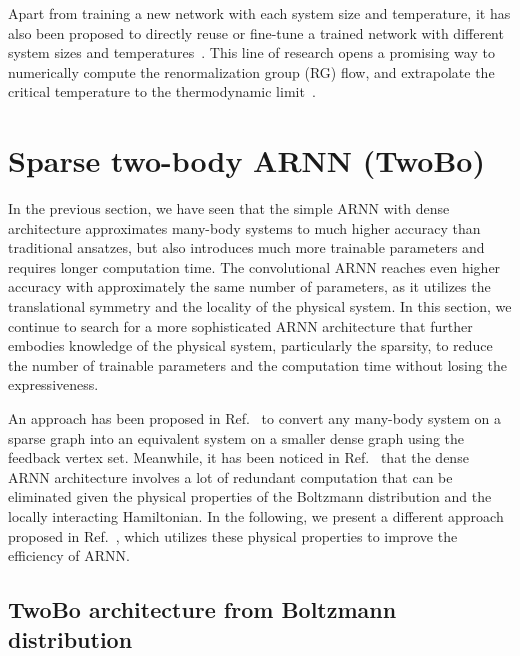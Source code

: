Apart from training a new network with each system size and temperature, it has also been proposed to directly reuse or fine-tune a trained network with different system sizes and temperatures~\cite{efthymiou2019super, mills2019extensive, rende2024fine}. This line of research opens a promising way to numerically compute the renormalization group (RG) flow, and extrapolate the critical temperature to the thermodynamic limit~\cite{ron2002inverse}.

\section{Sparse two-body ARNN (TwoBo)}
\label{sec:twobo}

In the previous section, we have seen that the simple ARNN with dense architecture approximates many-body systems to much higher accuracy than traditional ansatzes, but also introduces much more trainable parameters and requires longer computation time. The convolutional ARNN reaches even higher accuracy with approximately the same number of parameters, as it utilizes the translational symmetry and the locality of the physical system. In this section, we continue to search for a more sophisticated ARNN architecture that further embodies knowledge of the physical system, particularly the sparsity, to reduce the number of trainable parameters and the computation time without losing the expressiveness.

An approach has been proposed in Ref.~\cite{pan2021solving} to convert any many-body system on a sparse graph into an equivalent system on a smaller dense graph using the feedback vertex set. Meanwhile, it has been noticed in Ref.~\cite{pr2021analysis} that the dense ARNN architecture involves a lot of redundant computation that can be eliminated given the physical properties of the Boltzmann distribution and the locally interacting Hamiltonian. In the following, we present a different approach proposed in Ref.~\cite{biazzo2024sparse}, which utilizes these physical properties to improve the efficiency of ARNN.

\subsection{TwoBo architecture from Boltzmann distribution}

